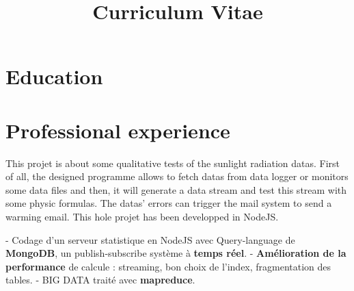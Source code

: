 \documentclass[11pt,a4paper]{moderncv}
\title{Curriculum Vitae}
\begin{document}
\maketitle

\section{Education}


\section{Professional experience}

{
This projet is about some qualitative tests of the sunlight radiation datas. First of all, the designed programme allows to fetch datas from data logger or monitors some data files and then, it will generate a data stream and test this stream with some physic formulas. The datas' errors can trigger the mail system to send a warming email. This hole projet has been developped in NodeJS.
}

{
- Codage d'un serveur statistique en NodeJS avec Query-language de \textbf{MongoDB}, un publish-subscribe système à \textbf{temps réel}.\newline
- \textbf{Amélioration de la performance} de calcule : streaming, bon choix de l'index, fragmentation des tables.\newline
- BIG DATA traité avec \textbf{mapreduce}.
}
\end{document}
